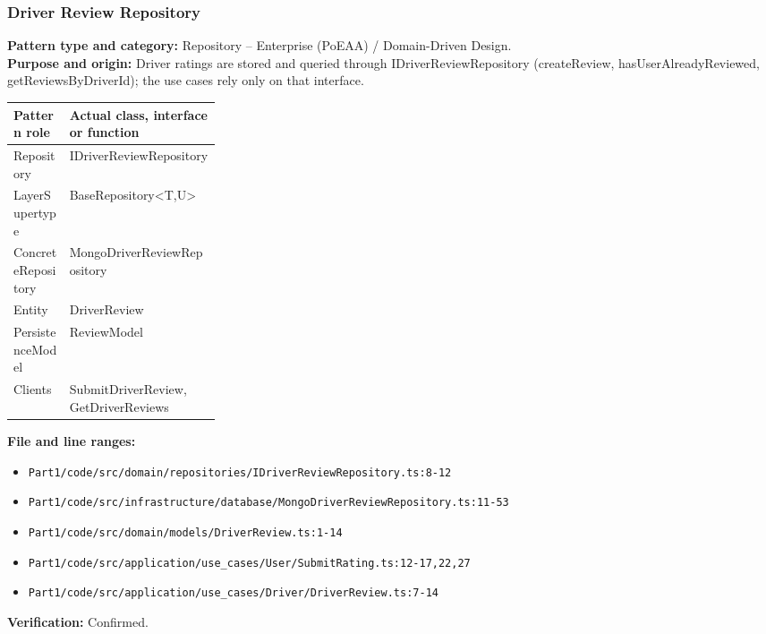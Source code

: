 \documentclass[11pt,a4paper]{article}
\begin{document}
\subsubsection*{Driver Review Repository}
\textbf{Pattern type and category:} Repository -- Enterprise (PoEAA) / Domain-Driven Design.\\
\textbf{Purpose and origin:} Driver ratings are stored and queried through IDriverReviewRepository (createReview, hasUserAlreadyReviewed, getReviewsByDriverId); the use cases rely only on that interface.

\noindent\begin{tabularx}{\linewidth}{@{}P{0.27\linewidth}Y@{}}
\toprule Pattern role & Actual class, interface or function \\ \midrule
Repository & IDriverReviewRepository \\
LayerSupertype & BaseRepository\textless{}T,U\textgreater{} \\
ConcreteRepository & MongoDriverReviewRepository \\
Entity & DriverReview \\
PersistenceModel & ReviewModel \\
Clients & SubmitDriverReview, GetDriverReviews \\
\bottomrule
\end{tabularx}

\noindent\textbf{File and line ranges:}\begin{itemize}\setlength\itemsep{0pt}\item \texttt{Part1/\allowbreak{}code/\allowbreak{}src/\allowbreak{}domain/\allowbreak{}repositories/\allowbreak{}IDriverReviewRepository.\allowbreak{}ts:8-12}\item \texttt{Part1/\allowbreak{}code/\allowbreak{}src/\allowbreak{}infrastructure/\allowbreak{}database/\allowbreak{}MongoDriverReviewRepository.\allowbreak{}ts:11-53}\item \texttt{Part1/\allowbreak{}code/\allowbreak{}src/\allowbreak{}domain/\allowbreak{}models/\allowbreak{}DriverReview.\allowbreak{}ts:1-14}\item \texttt{Part1/\allowbreak{}code/\allowbreak{}src/\allowbreak{}application/\allowbreak{}use\_\allowbreak{}cases/\allowbreak{}User/\allowbreak{}SubmitRating.\allowbreak{}ts:12-17,22,27}\item \texttt{Part1/\allowbreak{}code/\allowbreak{}src/\allowbreak{}application/\allowbreak{}use\_\allowbreak{}cases/\allowbreak{}Driver/\allowbreak{}DriverReview.\allowbreak{}ts:7-14}\end{itemize}
\noindent\textbf{Verification:} Confirmed.
\end{document}
